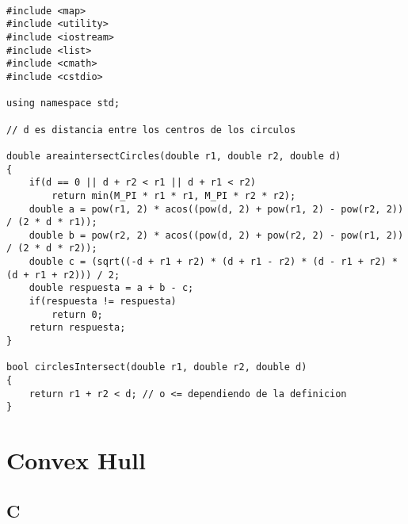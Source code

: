 \documentclass[a4paper, 11pt, oneside]{report}
\begin{document}
\begin{verbatim}

#include <map>
#include <utility>
#include <iostream>
#include <list>
#include <cmath>
#include <cstdio>

using namespace std;

// d es distancia entre los centros de los circulos 

double areaintersectCircles(double r1, double r2, double d)
{
    if(d == 0 || d + r2 < r1 || d + r1 < r2)
        return min(M_PI * r1 * r1, M_PI * r2 * r2);
    double a = pow(r1, 2) * acos((pow(d, 2) + pow(r1, 2) - pow(r2, 2)) / (2 * d * r1));
    double b = pow(r2, 2) * acos((pow(d, 2) + pow(r2, 2) - pow(r1, 2)) / (2 * d * r2));
    double c = (sqrt((-d + r1 + r2) * (d + r1 - r2) * (d - r1 + r2) * (d + r1 + r2))) / 2;
    double respuesta = a + b - c;
    if(respuesta != respuesta)
        return 0;
    return respuesta;
}

bool circlesIntersect(double r1, double r2, double d)
{
	return r1 + r2 < d; // o <= dependiendo de la definicion
}

\end{verbatim}

\section{Convex Hull}

\subsection*{C}
\end{document}
